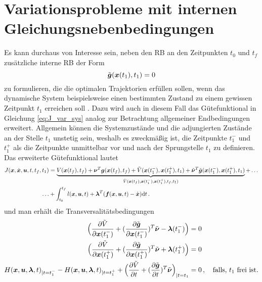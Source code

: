 \section{Variationsprobleme mit internen Gleichungsnebenbedingungen}\label{sec:InterneGNB}
Es kann durchaus von Interesse sein, neben den \gls{RB} an den Zeitpunkten $t_0$ und $t_f$ zusätzliche interne \gls{RB} der Form
\begin{equation}
	\tilde{\boldsymbol{g}}(\boldsymbol{x}(t_1),t_1) = 0
\end{equation} zu formulieren, die die optimalen Trajektorien erfüllen sollen, wenn das dynamische System beispielsweise einen bestimmten Zustand zu einem gewissen Zeitpunkt $t_1$ erreichen soll \cite{Papageorgiou.2012}. Dazu wird auch in diesem Fall das Gütefunktional in Gleichung \ref{eq:J_var_sys} analog zur Betrachtung allgemeiner Endbedingungen erweitert. Allgemein können die Systemzustände und die adjungierten Zustände an der Stelle $t_1$ unstetig sein, weshalb es zweckmäßig ist, die Zeitpunkte $t_1^-$ und $t_1^+$ als die Zeitpunkte unmittelbar vor und nach der Sprungstelle $t_1$ zu definieren. Das erweiterte Gütefunktional lautet
\begin{equation}
\begin{split}
J(\boldsymbol{x},\dot{\boldsymbol{x}},\boldsymbol{u},t,t_f,t_1) &= \underbrace{V(\boldsymbol{x}(t_f),t_f) + \boldsymbol{\nu}^T\boldsymbol{g}(\boldsymbol{x}(t_f),t_f) + \tilde{V}(\boldsymbol{x}(t_1^-),\boldsymbol{x}(t_1^+),t_1) + \tilde{\boldsymbol{\nu}}^T\tilde{\boldsymbol{g}}(\boldsymbol{x}(t_1^-),\boldsymbol{x}(t_1^+),t_1)}_{\hat{V}(\boldsymbol{x}(t_f),\boldsymbol{x}(t_1^-),\boldsymbol{x}(t_1^+),t_f,t_1)} + \dots \\
\dots&+\int_{t_0}^{t_f}l(\boldsymbol{x},\boldsymbol{u},t) + \boldsymbol{\lambda}^T(\boldsymbol{f}(\boldsymbol{x},\boldsymbol{u},t) - \dot{\boldsymbol{x}})\textrm{d}{t}\,. \label{eq:J_var_sys_t1}
\end{split}
\end{equation}
und man erhält die Transversalitätsbedingungen \cite{Gerdts.2010}
\begin{align}
\Big(\frac{\partial \tilde{V}}{\partial \boldsymbol{x}(t_1^-)} + (\frac{\partial \tilde{\boldsymbol{g}}}{\partial \boldsymbol{x}(t_1^-)})^T\tilde{\boldsymbol{\nu}} - \boldsymbol{\lambda}(t_1^-)\Big) &= 0 \label{eq:Sprungbedingung1}\\
\Big(\frac{\partial \tilde{V}}{\partial \boldsymbol{x}(t_1^+)} + (\frac{\partial \tilde{\boldsymbol{g}}}{\partial \boldsymbol{x}(t_1^+)})^T\tilde{\boldsymbol{\nu}} + \boldsymbol{\lambda}(t_1^+)\Big) &= 0 \label{eq:Sprungbedingung1}\\
H(\boldsymbol{x},\boldsymbol{u},\boldsymbol{\lambda},t)_{|t=t_1^-} - H(\boldsymbol{x},\boldsymbol{u},\boldsymbol{\lambda},t)_{|t=t_1^+} + \Big(\frac{\partial \tilde{V}}{\partial t}+(\frac{\partial \tilde{\boldsymbol{g}}}{\partial t})^T\tilde{\boldsymbol{\nu}}\Big)_{|t=t_1}&= 0\,,\quad \textrm{falls, $t_1$ frei ist.}\label{eq:Transversalität_t1}
\end{align}

